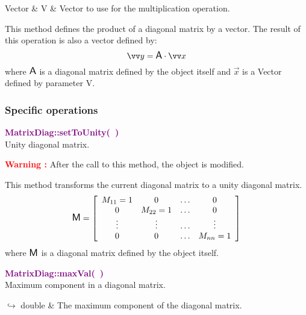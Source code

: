\begin{tcolorbox}[width=\textwidth,myArgs,tabularx={ll|R}]
Vector & V & Vector to use for the multiplication operation.
\end{tcolorbox}

This method defines the product of a diagonal matrix by a vector.
The result of this operation is also a vector defined by:
\begin{equation*}
\overrightarrow{y} = \A \cdot \overrightarrow{x}
\end{equation*}
where $\mbox{\large\ensuremath{\mathsf{A}}}$ is a diagonal matrix defined by the object itself and $\overrightarrow{x}$ is a Vector defined by parameter V.

\subsubsection{Specific operations}

\textcolor{purple}{\textbf{MatrixDiag::setToUnity(~)}}\label{MatrixDiag::setToUnity()}\\
Unity diagonal matrix.

\hspace*{10mm}\textcolor{red}{\textbf{Warning :}} After the call to this method, the object is modified.

This method transforms the current diagonal matrix to a unity diagonal matrix.
\begin{equation*}
\mbox{\large\ensuremath{\mathsf{M}}}=\left[\begin{array}{cccc}
  M_{11}=1 & 0 & \hdots & 0\\
  0 & M_{22}=1 & \hdots & 0\\
  \vdots & \vdots & \hdots & \vdots\\
  0 & 0 & \hdots & M_{nn}=1
  \end{array}\right]
\end{equation*}
where $\mbox{\large\ensuremath{\mathsf{M}}}$ is a diagonal matrix defined by the object itself.

\textcolor{purple}{\textbf{MatrixDiag::maxVal(~)}}\label{MatrixDiag::maxVal()}\\
Maximum component in a diagonal matrix.\vspace*{-0.5em}
\begin{tcolorbox}[grow to left by=-1cm, width=\textwidth-1cm,myArgs,tabularx={l|R}]
$\hookrightarrow$ double & The maximum component of the diagonal matrix.
\end{tcolorbox}

